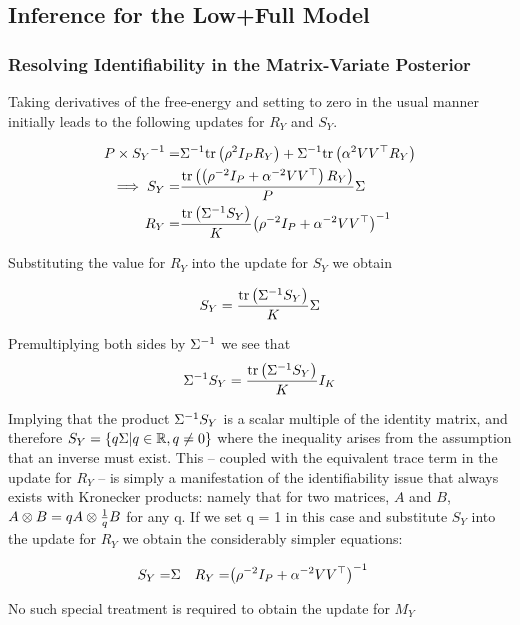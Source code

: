 \subsection{Inference for the Low+Full Model}
\subsubsection{Resolving Identifiability in the Matrix-Variate Posterior}
Taking derivatives of the free-energy and setting to zero in the usual manner initially leads to the following updates for $R_Y$ and $S_Y$.

\begin{align}
P \times {S_Y}^{-1} = & {\Sigma}^{-1}\text{tr} \left( {\rho^2 I_P R_Y} \right) + {\Sigma}^{-1}\text{tr} \left( {\alpha^2 V V^\top R_Y} \right) \\
\implies S_Y = & \frac{\text{tr} \left( {\left(\rho^{-2} I_P + \alpha^{-2} V V^\top\right) R_Y} \right)}{P} \Sigma \\ 
R_Y = & \frac{\text{tr} \left( {{\Sigma}^{-1}S_Y} \right)}{K} {\left( \rho^{-2} I_P + \alpha^{-2} V V^\top \right)}^{-1}\end{align}

Substituting the value for $R_Y$ into the update for $S_Y$ we obtain

\begin{align}
S_Y = \frac{\text{tr} \left( {{\Sigma}^{-1}S_Y} \right)}{K} \Sigma
\end{align}

Premultiplying both sides by ${\Sigma}^{-1}$ we see that
\begin{align}
{\Sigma}^{-1} S_Y = \frac{\text{tr} \left( {{\Sigma}^{-1}S_Y} \right)}{K} I_K
\end{align}

Implying that the product ${\Sigma}^{-1} S_Y$ is a scalar multiple of the identity matrix, and therefore $S_Y = \{ q \Sigma | q \in { \mathbb{R} }, q \neq 0 \}$ where the inequality arises from the assumption that an inverse must exist. This -- coupled with the equivalent trace term in the update for $R_Y$ -- is simply a manifestation of the identifiability issue that always exists with Kronecker products: namely that for two matrices, $A$ and $B$, $A \otimes B = q A \otimes \frac{1}{ {q} }B$ for any q. If we set q = 1 in this case and substitute $S_Y$ into the update for $R_Y$ we obtain the considerably simpler equations:

\begin{align}
S_Y = & \Sigma &
R_Y = & {\left( \rho^{-2} I_P + \alpha^{-2}V V^\top \right)}^{-1}
\end{align}

No such special treatment is required to obtain the update for $M_Y$

